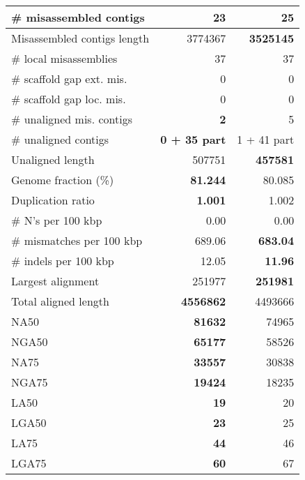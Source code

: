 \documentclass[12pt,a4paper]{article}
\begin{document}
\begin{table}[ht]
\begin{center}
\begin{tabular}{|l*{2}{|r}|}
\# misassembled contigs & {\bf 23} & 25 \\ \hline
Misassembled contigs length & 3774367 & {\bf 3525145} \\ \hline
\# local misassemblies & 37 & 37 \\ \hline
\# scaffold gap ext. mis. & 0 & 0 \\ \hline
\# scaffold gap loc. mis. & 0 & 0 \\ \hline
\# unaligned mis. contigs & {\bf 2} & 5 \\ \hline
\# unaligned contigs & {\bf 0 + 35 part} & 1 + 41 part \\ \hline
Unaligned length & 507751 & {\bf 457581} \\ \hline
Genome fraction (\%) & {\bf 81.244} & 80.085 \\ \hline
Duplication ratio & {\bf 1.001} & 1.002 \\ \hline
\# N's per 100 kbp & 0.00 & 0.00 \\ \hline
\# mismatches per 100 kbp & 689.06 & {\bf 683.04} \\ \hline
\# indels per 100 kbp & 12.05 & {\bf 11.96} \\ \hline
Largest alignment & 251977 & {\bf 251981} \\ \hline
Total aligned length & {\bf 4556862} & 4493666 \\ \hline
NA50 & {\bf 81632} & 74965 \\ \hline
NGA50 & {\bf 65177} & 58526 \\ \hline
NA75 & {\bf 33557} & 30838 \\ \hline
NGA75 & {\bf 19424} & 18235 \\ \hline
LA50 & {\bf 19} & 20 \\ \hline
LGA50 & {\bf 23} & 25 \\ \hline
LA75 & {\bf 44} & 46 \\ \hline
LGA75 & {\bf 60} & 67 \\ \hline
\end{tabular}
\end{center}
\end{table}
\end{document}
